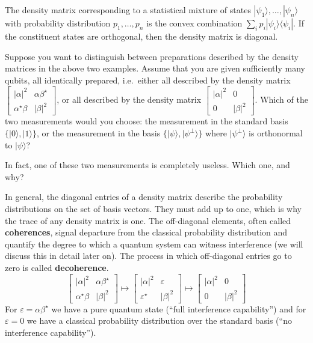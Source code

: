 \documentclass[fleqn,a4paper]{article}
\newenvironment{idea}{\everypar{\setlength{\parindent}{1.5em}}}{}
\theoremstyle{definition}
\theoremstyle{definition}
\theoremstyle{definition}
\theoremstyle{definition}
\theoremstyle{remark}
\begin{document}
\begin{idea}
The density matrix corresponding to a statistical mixture of states \(|\psi_1\rangle,\ldots,|\psi_n\rangle\) with probability distribution \(p_1,\ldots,p_n\) is the convex combination \(\sum_i p_i|\psi_i\rangle\langle\psi_i|\).
If the constituent states are orthogonal, then the density matrix is diagonal.

\end{idea}

Suppose you want to distinguish between preparations described by the density matrices in the above two examples.
Assume that you are given sufficiently many qubits, all identically prepared, i.e.~either all described by the density matrix \(\left[\begin{smallmatrix}|\alpha|^2&\alpha\beta^\star\\\alpha^\star\beta&|\beta|^2\end{smallmatrix}\right]\), or all described by the density matrix \(\left[\begin{smallmatrix}|\alpha|^2&0\\0&|\beta|^2\end{smallmatrix}\right]\).
Which of the two measurements would you choose: the measurement in the standard basis \(\{|0\rangle,|1\rangle\}\), or the measurement in the basis \(\{|\psi\rangle,|\psi^\perp\rangle\}\) where \(|\psi^\perp\rangle\) is orthonormal to \(|\psi\rangle\)?

In fact, one of these two measurements is completely useless.
Which one, and why?

In general, the diagonal entries of a density matrix describe the probability distributions on the set of basis vectors.
They must add up to one, which is why the trace of any density matrix is one.
The off-diagonal elements, often called \textbf{coherences}, signal departure from the classical probability distribution and quantify the degree to which a quantum system can witness interference (we will discuss this in detail later on).
The process in which off-diagonal entries go to zero is called \textbf{decoherence}.
\[
  \begin{bmatrix}
    |\alpha|^2 & \alpha\beta^\star
  \\\alpha^\star\beta & |\beta|^2
  \end{bmatrix}
  \longmapsto
  \begin{bmatrix}
    |\alpha|^2 & \varepsilon
  \\\varepsilon^\star & |\beta|^2
  \end{bmatrix}
  \longmapsto
  \begin{bmatrix}
    |\alpha|^2 & 0
  \\0 & |\beta|^2
  \end{bmatrix}
\]
For \(\varepsilon = \alpha\beta^\star\) we have a pure quantum state (``full interference capability'') and for \(\varepsilon=0\) we have a classical probability distribution over the standard basis (``no interference capability'').
\end{document}
